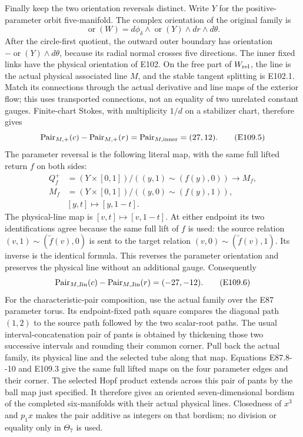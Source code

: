 Finally keep the two orientation reversals distinct. Write \(Y\) for the positive-parameter orbit five-manifold. The complex orientation of the original family is
\[
 \operatorname{or}(W)=d\phi_\delta\wedge\operatorname{or}(Y)
                       \wedge dr\wedge d\theta.
 \tag{E109.4}
\]
After the circle-first quotient, the outward outer boundary has orientation \(-\operatorname{or}(Y)\wedge d\theta\), because its radial normal crosses five directions. The inner fixed links have the physical orientation of E102. On the free part of \(W_{\rm rel}\), the line is the actual physical associated line \(M\), and the stable tangent splitting is E102.1. Match its connections through the actual derivative and line maps of the exterior flow; this uses transported connections, not an equality of two unrelated constant gauges. Finite-chart Stokes, with multiplicity \(1/d\) on a stabilizer chart, therefore gives
\[
 \operatorname{Pair}_{M,+}(c)-\operatorname{Pair}_{M,+}(r)
       =\operatorname{Pair}_{M,\rm inner}=(27,12).
 \tag{E109.5}
\]
The parameter reversal is the following literal map, with the same full lifted return \(f\) on both sides:
\[
 \begin{aligned}
 Q_f^+&=(Y\times[0,1])/((y,1)\sim(f(y),0))\longrightarrow M_f,\\
 M_f&=(Y\times[0,1])/((y,0)\sim(f(y),1)),\\
 &[y,t]\longmapsto[y,1-t].
 \end{aligned}
 \tag{E109.5a}
\]
The physical-line map is \([v,t]\mapsto[v,1-t]\). At either endpoint its two identifications agree because the same full lift of \(f\) is used: the source relation \((v,1)\sim(\widetilde f(v),0)\) is sent to the target relation \((v,0)\sim(\widetilde f(v),1)\). Its inverse is the identical formula. This reverses the parameter orientation and preserves the physical line without an additional gauge. Consequently
\[
 \operatorname{Pair}_{M,\rm Jin}(c)-\operatorname{Pair}_{M,\rm Jin}(r)
                              =(-27,-12).
 \tag{E109.6}
\]
For the characteristic-pair composition, use the actual family over the E87 parameter torus. Its endpoint-fixed path square compares the diagonal path \((1,2)\) to the source path followed by the two scalar-root paths. The usual interval-concatenation pair of pants is obtained by thickening those two successive intervals and rounding their common corner. Pull back the actual family, its physical line and the selected tube along that map. Equations E87.8-\/-10 and E109.3 give the same full lifted maps on the four parameter edges and their corner. The selected Hopf product extends across this pair of pants by the ball map just specified. It therefore gives an oriented seven-dimensional bordism of the completed six-manifolds with their actual physical lines. Closedness of \(x^3\) and \(p_1x\) makes the pair additive as integers on that bordism; no division or equality only in \(\Theta_7\) is used.

